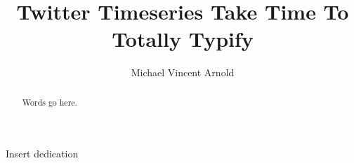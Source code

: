 \documentclass[12pt]{report}
\title{Twitter Timeseries Take Time To Totally Typify}
\author{Michael Vincent Arnold}
\begin{document}
\maketitle
{}

\begin{abstract}
	
\vspace{10mm}

Words go here.

\end{abstract}

\begin{dedication}
	
	
\end{dedication}

\begin{acknowledgements}

  Insert dedication

\end{acknowledgements}

\newpage

\tableofcontents
\newpage


\listoffigures
\newpage

\listoftables
\newpage

\doublespacing


%
%
%
%
%
%

\newpage



\end{document}

